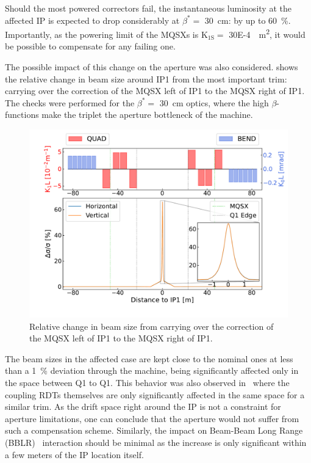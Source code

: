 Should the most powered correctors fail, the instantaneous luminosity at the affected IP is expected to drop considerably at \(\beta^{\ast} =\) \qty{30}{\centi\meter}: by up to \qty{60}{\percent}.
Importantly, as the powering limit of the MQSXs is \(\mathrm{K_{1S}} =\) \qty{30E-4}{\per\square\meter}, it would be possible to compensate for any failing one.

The possible impact of this change on the aperture was also considered.
 shows the relative change in beam size around IP\num{1} from the most important trim: carrying over the correction of the MQSX left of IP\num{1} to the MQSX right of IP\num{1}.
The checks were performed for the \(\beta^{\ast} =\) \qty{30}{\centi\meter} optics, where the high \(\beta\)-functions make the triplet the aperture bottleneck of the machine.

\begin{figure}[!htb]
    \centering
    \includegraphics*[width=\textwidth]{Figures/IR_Coupling_Correction/carry_over_to_ir1_right_beam_size_impact.pdf}
    \caption{Relative change in beam size from carrying over the correction of the MQSX left of IP\num{1} to the MQSX right of IP\num{1}.}
    \label{figure:carry_over_impact_on_beam_size}
\end{figure}

The beam sizes in the affected case are kept close to the nominal ones at less than a \qty{1}{\percent} deviation through the machine, being significantly affected only in the space between Q\num{1} to Q\num{1}.
This behavior was also observed in~\cite{PRAB:Hofer:Coupling_Local_Observables} where the coupling RDTs themselves are only significantly affected in the same space for a similar trim.
As the drift space right around the IP is not a constraint for aperture limitations, one can conclude that the aperture would not suffer from such a compensation scheme.
Similarly, the impact on Beam-Beam Long Range (BBLR)~\cite{PHD:Poyet} interaction should be minimal as the increase is only significant within a few meters of the IP location itself.

